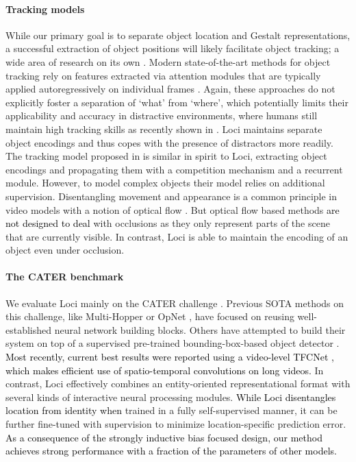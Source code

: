 \documentclass{article} \usepackage{iclr2023_conference_arxiv,times}
\newcommand{\changed}{\textcolor{black}}
\begin{document}
\paragraph{Tracking models}
While our primary goal is to separate object location and Gestalt representations, a successful extraction of object positions will likely facilitate object tracking; a wide area of research on its own \citep{weis2021benchmarking}. 
Modern state-of-the-art methods for object tracking rely on features extracted via attention modules that are typically applied autoregressively on individual frames \citep{chen21transt,meinhardt21trackformer}. 
Again, these approaches do not explicitly foster a separation of `what' from `where', which potentially limits their applicability and accuracy in distractive environments, where humans still maintain high tracking skills as recently shown in \citep{linsley21tracking}. Loci maintains separate object encodings and thus copes with the presence of distractors more readily.
The tracking model proposed in \cite{linsley21tracking} is similar in spirit to Loci, extracting object encodings and propagating them with a competition mechanism and a recurrent module. However, to model complex objects their model relies on additional supervision.
Disentangling movement and appearance is a common principle in video models with a notion of optical flow \citep{liu21objectness}. But optical flow based methods \changed{are not designed to deal} with occlusions as they only represent parts of the scene that are currently visible.
In contrast, Loci is able to maintain the encoding of an object even under occlusion. 


\paragraph{The CATER benchmark}
We evaluate  Loci mainly on the CATER challenge \cite{girdhar2019CATER}.
Previous SOTA methods on this challenge, like Multi-Hopper or OpNet \cite{shamsian2020learning,zhou2021hopper}, have focused on reusing well-established neural network building blocks. 
Others have attempted to build their system on top of a supervised pre-trained bounding-box-based object detector \cite{carion2020end,zhu2018distractor}.
\changed{Most recently, current best results were reported using a video-level TFCNet \citep{zhang2022tfcnet}, which makes efficient use of spatio-temporal convolutions on long videos.} 
In contrast, Loci effectively combines an entity-oriented representational format with several kinds of interactive neural processing modules. 
\changed{While Loci disentangles location from identity when} trained in a fully self-supervised manner, it can be further fine-tuned with supervision to minimize location-specific prediction error. 
\changed{As a consequence of the strongly inductive bias focused design, our method achieves strong performance with a fraction of the parameters of other models.}
\end{document}
